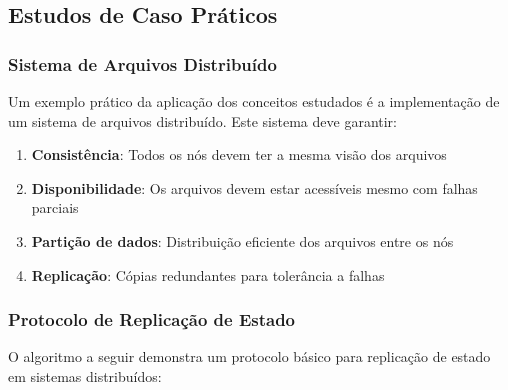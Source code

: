 \subsection{Estudos de Caso Práticos}

\subsubsection{Sistema de Arquivos Distribuído}

Um exemplo prático da aplicação dos conceitos estudados é a implementação de um sistema de arquivos distribuído. Este sistema deve garantir:

\begin{enumerate}
    \item \textbf{Consistência}: Todos os nós devem ter a mesma visão dos arquivos
    \item \textbf{Disponibilidade}: Os arquivos devem estar acessíveis mesmo com falhas parciais
    \item \textbf{Partição de dados}: Distribuição eficiente dos arquivos entre os nós
    \item \textbf{Replicação}: Cópias redundantes para tolerância a falhas
\end{enumerate}

\subsubsection{Protocolo de Replicação de Estado}

O algoritmo a seguir demonstra um protocolo básico para replicação de estado em sistemas distribuídos:

